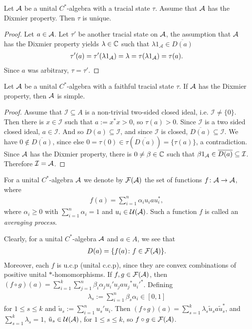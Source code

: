 \begin{lemma}
Let $\mathcal{A}$ be a unital $C^*$-algebra with a tracial state $\tau$. Assume that $\mathcal{A}$ has the Dixmier property. Then $\tau$ is unique.
\begin{proof}
Let $a \in \mathcal{A}$. Let $\tau'$ be another tracial state on $\mathcal{A}$, the assumption that $\mathcal{A}$ has the Dixmier property yields $\lambda \in \mathbb{C}$ such that $\lambda 1_{\mathcal{A}} \in \overline{D(a)}$
\begin{align*}
\tau'(a)=\tau'(\lambda 1_{\mathcal{A}})=\lambda = \tau(\lambda 1_{\mathcal{A}})=\tau(a).
\end{align*}
Since $a $ was arbitrary, $\tau=\tau'$.
\end{proof}
\end{lemma}

\begin{proposition}\label{dixmier simple}
Let $\mathcal{A}$ be a unital $C^*$-algebra with a faithful tracial state $\tau$. If $\mathcal{A}$ has the Dixmier property, then $\mathcal{A}$ is simple.
\begin{proof}
Assume that $\mathcal{I}\subseteq A$ is a non-trivial two-sided closed ideal, i.e. $\mathcal{I} \neq \{0\}$. Then there is $x \in \mathcal{I}$ such that $a:=x^*x >0$, so $\tau(a)>0$. Since $\mathcal{I}$ is a two sided closed ideal, $a \in \mathcal{I}$. And so $D(a) \subseteq \mathcal{I}$, and since $\mathcal{I}$ is closed, $\overline{D(a)} \subseteq \mathcal{I}$.  We have $0 \not\in \overline{D(a)}$, since else $0 = \tau(0)\in \tau\left(\overline{D(a)}\right)=\{\tau(a)\}$, a contradiction. Since $\mathcal{A}$ has the Dixmier property, there is $0 \neq \beta \in \mathbb{C}$ such that $\beta 1_{\mathcal{A}} \in \overline{D(a)} \subseteq \mathcal{I}$. Therefore $\mathcal{I}=\mathcal{A}$.
\end{proof}
\end{proposition}

\begin{definition}
For a unital $C^*$-algebra $\mathcal{A}$ we denote by $\mathcal{F}(\mathcal{A})$ the set of functions $f \colon \mathcal{A} \to \mathcal{A}$, where
\begin{align*}
f(a)=\sum_{i=1}^n \alpha_i u_i a u_i^*,
\end{align*}
where $\alpha_i \geq 0$ with $\sum_{i=1}^n \alpha_i=1$ and $u_i \in \mathcal{U}(\mathcal{A})$. Such a function $f$ is called an \emph{averaging process}.
\end{definition}

\noindent Clearly, for a unital $C^*$-algebra $\mathcal{A}$ and $a \in A$, we see that
\begin{align*}
D(a)=\{f(a) \colon f \in \mathcal{F}(\mathcal{A})\}.
\end{align*}
Moreover, each $f$ is u.c.p (unital c.c.p), since they are convex combinations of positive unital $*$-homomorphisms. If $f,g \in \mathcal{F}(\mathcal{A})$, then $(f \circ g)(a)=\sum_{i=1}^k \sum_{j=1}^n \beta_i \alpha_j u_i' u_j a  {u_j}^* {u_i'}^* $. Defining
\begin{align*}
\lambda_{s}:=\sum_{i=1}^n \beta_{s}\alpha_{i} \in [0,1]
\end{align*} for $1 \leq s \leq k$ and $\tilde{u}_s:= \sum_{i=1}^n u_s' u_i$. Then $(f \circ g) (a)=\sum_{s=1}^k \lambda_{s} \tilde{u}_s a \tilde{u}_s^*$, and $\sum_{s=1}^k \lambda_{s}=1$, $\tilde{u}_s \in \mathcal{U}(\mathcal{A})$, for $1 \leq s \leq k$, so $f \circ g \in \mathcal{F}(\mathcal{A})$.

